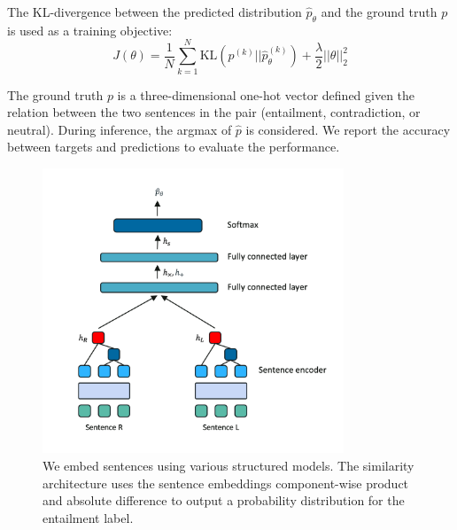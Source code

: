 The KL-divergence between the predicted distribution $\hat{p}_{\theta}$ and the ground truth $p$ is used as a training objective:
\begin{equation}
J(\theta) = \frac{1}{N}\sum_{k=1}^{N}\text{KL}(p^{(k)} \Big|\Big| \hat{p}_{\theta}^{(k)}) + \frac{\lambda}{2}||\theta||_{2}^{2}
\end{equation}

The ground truth $p$ is a three-dimensional one-hot vector defined given the relation between the two sentences in the pair (entailment, contradiction, or neutral). During inference, the argmax of $\hat{p}$ is considered. We report the accuracy between targets and predictions to evaluate the performance.



\begin{figure}[!htb]
\begin{center}
\includegraphics[width=9cm]{images/similarity.png}
\end{center}
\caption{We embed sentences using various structured models. The similarity architecture uses the sentence embeddings component-wise product and absolute difference to output a probability distribution for the entailment label.}
\end{figure}

